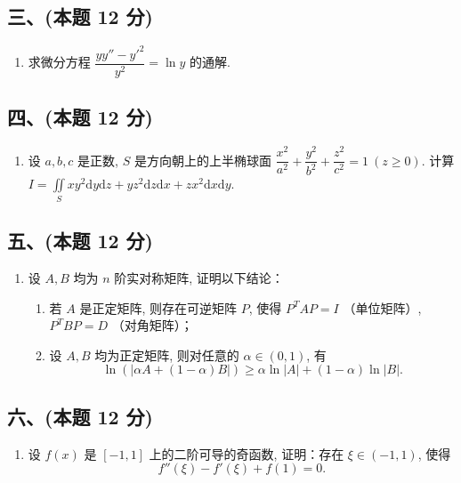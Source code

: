 \subsection*{三、(本题 12 分)}
\begin{enumerate}[start=7]
    \item 求微分方程 $\dfrac{yy'' - y'^2}{y^2} = \ln y$ 的通解.
\end{enumerate}

\subsection*{四、(本题 12 分)}
\begin{enumerate}[start=8]
    \item 设 $a, b, c$ 是正数, $S$ 是方向朝上的上半椭球面
          $\dfrac{x^2}{a^2} + \dfrac{y^2}{b^2} + \dfrac{z^2}{c^2} = 1 \ (z \geq 0).$
          计算 $I = \displaystyle\iint\limits_{S} xy^2 \mathrm{d}y \mathrm{d}z + yz^2 \mathrm{d}z \mathrm{d}x + zx^2 \mathrm{d}x \mathrm{d}y$.
\end{enumerate}

\subsection*{五、(本题 12 分)}
\begin{enumerate} [start=9]
    \item 设 $A, B$ 均为 $n$ 阶实对称矩阵, 证明以下结论：
          \begin{enumerate}
              \item[(1)] 若 $A$ 是正定矩阵, 则存在可逆矩阵 $P$, 使得 $P^TAP = I$ （单位矩阵）, $P^TBP = D$ （对角矩阵）；
              \item[(2)] 设 $A, B$ 均为正定矩阵, 则对任意的 $\alpha \in (0, 1)$, 有
                    \[
                        \ln(|\alpha A + (1 - \alpha)B|) \geq \alpha \ln |A| + (1 - \alpha) \ln |B|.
                    \]
          \end{enumerate}
\end{enumerate}

\subsection*{六、(本题 12 分)}
\begin{enumerate}[start=10]
    \item 设 $f(x)$ 是 $[-1, 1]$ 上的二阶可导的奇函数, 证明：存在 $\xi \in (-1, 1)$, 使得
          \[
              f''(\xi) - f'(\xi) + f(1) = 0.
          \]
\end{enumerate}

